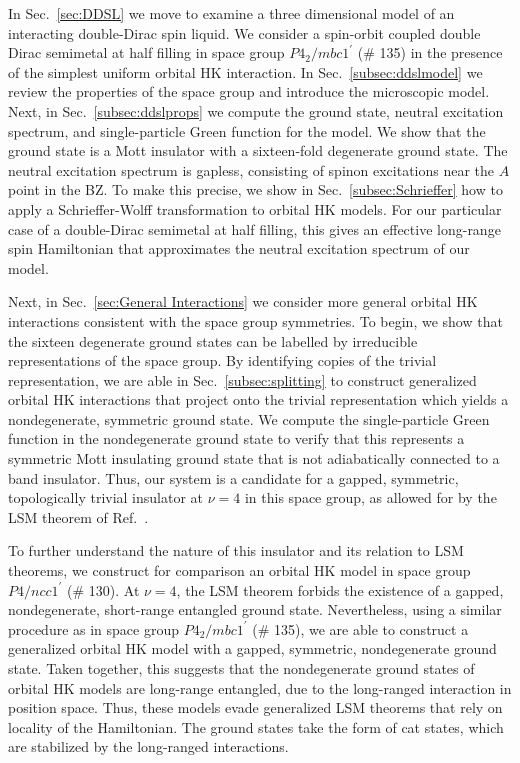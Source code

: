 \documentclass[prb,aps,amssymb,twocolumn,notitlepage]{revtex4-2}
\begin{document}
In Sec.~\ref{sec:DDSL} we move to examine a three dimensional model of an interacting double-Dirac spin liquid. 
We consider a spin-orbit coupled double Dirac semimetal at half filling in space group $P4_2/mbc1^\prime$ (\# 135) in the presence of the simplest uniform orbital HK interaction. 
In Sec.~\ref{subsec:ddslmodel} we review the properties of the space group and introduce the microscopic model. 
Next, in Sec.~\ref{subsec:ddslprops} we compute the ground state, neutral excitation spectrum, and single-particle Green function for the model. 
We show that the ground state is a Mott insulator with a sixteen-fold degenerate ground state. 
The neutral excitation spectrum is gapless, consisting of spinon excitations near the $A$ point in the BZ. 
To make this precise, we show in Sec.~\ref{subsec:Schrieffer} how to apply a Schrieffer-Wolff transformation to orbital HK models. 
For our particular case of a double-Dirac semimetal at half filling, this gives an effective long-range spin Hamiltonian that approximates the neutral excitation spectrum of our model. 

Next, in Sec.~\ref{sec:General Interactions} we consider more general orbital HK interactions consistent with the space group symmetries. 
To begin, we show that the sixteen degenerate ground states can be labelled by irreducible representations of the space group. 
By identifying copies of the trivial representation, we are able in Sec.~\ref{subsec:splitting} to construct generalized orbital HK interactions that project onto the trivial representation which yields a nondegenerate, symmetric ground state. 
We compute the single-particle Green function in the nondegenerate ground state to verify that this represents a symmetric Mott insulating ground state that is not adiabatically connected to a band insulator. 
Thus, our system is a candidate for a gapped, symmetric, topologically trivial insulator at $\nu=4$ in this space group, as allowed for by the LSM theorem of Ref.~\cite{watanabe2015filling}.

To further understand the nature of this insulator and its relation to LSM theorems, we construct for comparison an orbital HK model in space group $P4/ncc1^\prime$ (\# 130). 
At $\nu=4$, the LSM theorem forbids the existence of a gapped, nondegenerate, short-range entangled ground state. 
Nevertheless, using a similar procedure as in space group $P4_2/mbc1^\prime$ (\# 135), we are able to construct a generalized orbital HK model with a gapped, symmetric, nondegenerate ground state. 
Taken together, this suggests that the nondegenerate ground states of orbital HK models are long-range entangled, due to the long-ranged interaction in position space. 
Thus, these models evade generalized LSM theorems that rely on locality of the Hamiltonian. 
The ground states take the form of cat states, which are stabilized by the long-ranged interactions.
\end{document}
